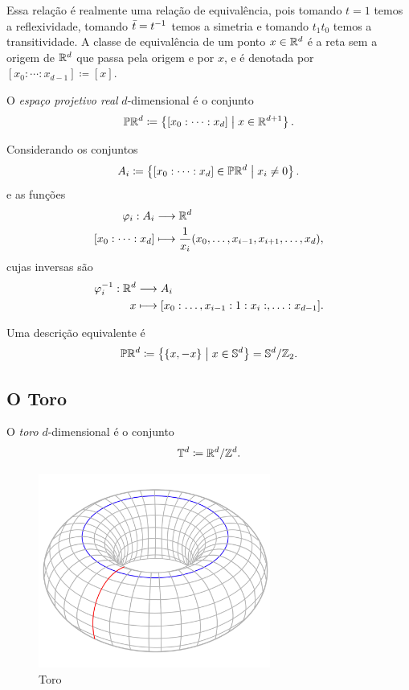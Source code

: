 Essa relação é realmente uma relação de equivalência, pois tomando $t=1$ temos a reflexividade, tomando $\bar t = t^{-1}$ temos a simetria e tomando $t_1t_0$ temos a transitividade. A classe de equivalência de um ponto $x \in \mathbb{R}^d$ é a reta sem a origem de $\mathbb{R}^d$ que passa pela origem e por $x$, e é denotada por $[x_0 : \cdots : x_{d-1}] \coloneqq [x]$.

\begin{defi}
O \emph{espaço projetivo real} $d$-dimensional é o conjunto
	\begin{equation*}
	\mathbb{P}\mathbb{R}^d \coloneqq \left\{[x_0 : \cdots : x_d] \;\middle\vert\; x \in \mathbb{R}^{d+1} \right\}.
	\end{equation*}
\end{defi}

Considerando os conjuntos
	\begin{equation*}
	A_i \coloneqq \left\{[x_0 : \cdots : x_d] \in \mathbb{P}\mathbb{R}^d \;\middle\vert\; x_i \neq 0 \right\}.
	\end{equation*}
e as funções
	\begin{align*}
	{\varphi_i}: {A_i} &\longrightarrow {\mathbb{R}^d} \\{[x_0 : \cdots : x_d]} &\longmapsto {\frac{1}{x_i}(x_0,\ldots,x_{i-1},x_{i+1},\ldots,x_d)},
	\end{align*}
cujas inversas são
	\begin{align*}
	{\varphi_i^{-1}}: {\mathbb{R}^d} &\longrightarrow {A_i} \\{x} &\longmapsto {[x_0:\ldots,x_{i-1}:1:x_i:,\ldots:x_{d-1}]}.
	\end{align*}

Uma descrição equivalente é
	\begin{equation*}
	\mathbb{P}\mathbb{R}^d \coloneqq \left\{\{x,-x\} \;\middle\vert\; x \in \mathbb{S}^d \right\} = \mathbb{S}^d/\mathbb{Z}_2.
	\end{equation*}

\subsection{O Toro}

\begin{defi}
	O \emph{toro} $d$-dimensional é o conjunto
	\begin{equation*}
	\mathbb{T}^d \coloneqq \mathbb{R}^d / \mathbb{Z}^d.
	\end{equation*}
\end{defi}

\begin{figure}[!h]
\centering
\includegraphics[width=3in]{./imagens/toro}
\caption{Toro}
\end{figure}

